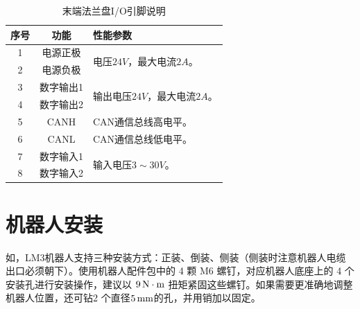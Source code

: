 \begin{enumerate}
\begin{table}[ht]
    \centering\small
\begin{tabular}{|c|c|l|}\hline
   \sf 序号	&  \sf 功能	& \sf  性能参数\\\hline
    1	&   电源正极   &  \multirow{2}{5cm}{
            电压$24\unit{V}$，最大电流$2\unit{A}$。
    }\\\cline{1-2}
    2	&   电源负极 & \\\hline
    3	&   数字输出1	&   \multirow{2}{5cm}{输出电压$24\unit{V}$，最大电流$2\unit{A}$。}\\\cline{1-2}
    4	&   数字输出2	&   \\\hline
    5	&   CANH	&  CAN通信总线高电平。 \\\hline
    6	&   CANL	& CAN通信总线低电平。  \\\hline
    7	&   数字输入1	&   \multirow{2}{5cm}{
            输入电压$3\sim 30\unit{V}$。
    }\\\cline{1-2}
    8	&   数字输入2	&   \\\hline
\end{tabular}
\caption{末端法兰盘I/O引脚说明}
\label{tab:法兰盘IO}
\end{table}

\end{enumerate}

\section{机器人安装}

如，LM3机器人支持三种安装方式：正装、倒装、侧装（侧装时注意机器人电缆出口必须朝下）。使用机器人配件包中的 4 颗 M6 螺钉，对应机器人底座上的 4 个安装孔进行安装操作，建议以 $9\,\mathrm{N\cdot m}$ 扭矩紧固这些螺钉。如果需要更准确地调整机器人位置，还可钻2 个直径$5 \,\mathrm{mm}$的孔，并用销加以固定。

